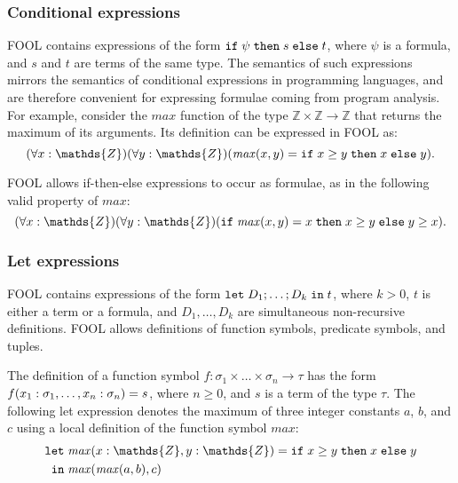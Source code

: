 \documentclass{easychair}
\begin{document}
\subsubsection*{Conditional expressions}
FOOL contains expressions of the form $\mathtt{if}\;{\psi}\;\allowbreak\mathtt{then}\;{s}\;\allowbreak\mathtt{else}\;{t}$, where $\psi$ is a
formula, and $s$ and $t$ are terms of the same type. 
The semantics of such expressions mirrors the semantics of conditional 
expressions in programming languages, and are therefore convenient for 
expressing formulae coming from program analysis. 
For example, consider the $\mathit{max}$ function of the type 
$\mathds{Z}\times\mathds{Z}\to\mathds{Z}$ that returns the maximum of its 
arguments. 
Its definition can be expressed in FOOL as:
\begin{equation}\label{eq:ite-t-example}
(\forall x:\mathds{Z})(\forall y:\mathds{Z})
(\mathit{max}(x, y) = \ite{x \geq y}{x}{y}).
\end{equation}

FOOL allows if-then-else expressions to occur as formulae, as in the
following valid property of $\mathit{max}$:
\begin{equation}\label{eq:ite-f-example}
(\forall x:\mathds{Z})(\forall y:\mathds{Z})
(\ite{\mathit{max}(x, y) = x}{x \geq y}{y \geq x}).
\end{equation}

\subsubsection*{Let expressions}
FOOL contains expressions of the form $\mathtt{let}\;{D_1;\ldots;D_k}\;\allowbreak\mathtt{in}\;{t}$, where
$k > 0$, $t$ is either a term or a formula, and $D_1,\ldots,D_k$ are
simultaneous non-recursive definitions. FOOL allows definitions of function
symbols, predicate symbols, and tuples.

The definition of a function symbol 
$f:\sigma_1\times\ldots\times\sigma_n\to\tau$ has the form 
${f(x_1:\sigma_1,\ldots,x_n:\sigma_n)}={s}$, where
$n \geq 0$, and $s$ is a term of the type $\tau$.
The following let expression denotes the maximum of three integer constants
$a$, $b$, and $c$ using a local definition of the function symbol
$\mathit{max}$:
\begin{equation}\label{eq:fool-let-impl}
\begin{aligned}
\mathtt{let}\;&\binding{\mathit{max}(x:\mathds{Z},y:\mathds{Z})}
                       {\ite{x \geq y}{x}{y}}\\
 \mathtt{in}\;&\mathit{max}(\mathit{max}(a,b),c)
\end{aligned}
\end{equation}
\end{document}
